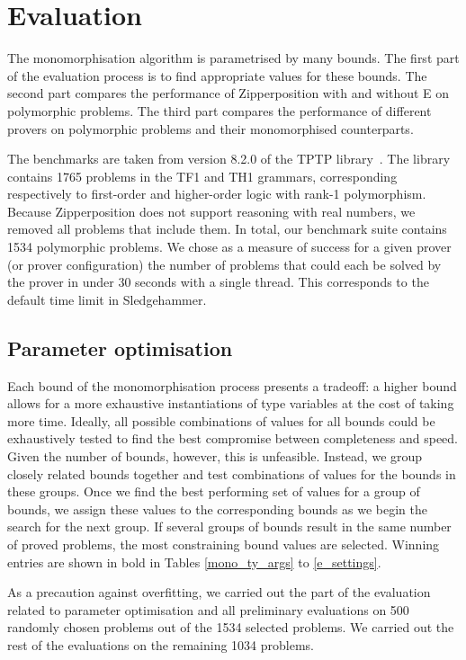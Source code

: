 \documentclass[runningheads]{llncs}
\begin{document}
\section{Evaluation}
\label{sec:evaluation}

The monomorphisation algorithm is parametrised by many bounds. The first part of the evaluation process is to find appropriate values for these bounds. The second part compares the performance of Zipperposition with and without E on polymorphic problems. The third part compares the performance of different provers on polymorphic problems and their monomorphised counterparts.

The benchmarks are taken from version 8.2.0 of the TPTP library~\cite{tptp}. The library contains 1765 problems in the TF1 and TH1 grammars, corresponding respectively to first-order and higher-order logic with rank-1 polymorphism. Because Zipperposition does not support reasoning with real numbers, we removed all problems that include them. In total, our benchmark suite contains 1534 polymorphic problems. We chose as a measure of success for a given prover (or prover configuration) the number of problems that could each be solved by the prover in under 30 seconds with a single thread. This corresponds to the default time limit in Sledgehammer.

\subsection{Parameter optimisation}
\label{param_opti}

Each bound of the monomorphisation process presents a tradeoff: a higher bound allows for a more exhaustive instantiations of type variables at the cost of taking more time. Ideally, all possible combinations of values for all bounds could be exhaustively tested to find the best compromise between completeness and speed. Given the number of bounds, however, this is unfeasible. Instead, we group closely related bounds together and test combinations of values for the bounds in these groups. Once we find the best performing set of values for a group of bounds, we assign these values to the corresponding bounds as we begin the search for the next group. If several groups of bounds result in the same number of proved problems, the most constraining bound values are selected. Winning entries are shown in bold in Tables \ref{mono_ty_args} to \ref{e_settings}.

As a precaution against overfitting, we carried out the part of the evaluation related to parameter optimisation and all preliminary evaluations on 500 randomly chosen problems out of the 1534 selected problems. We carried out the rest of the evaluations on the remaining 1034 problems.
\end{document}
